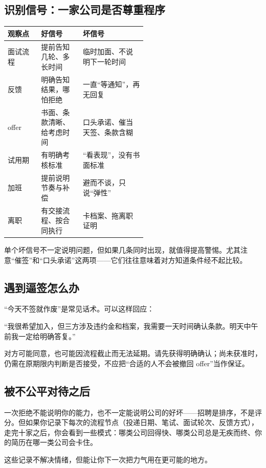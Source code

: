 \documentclass[UTF8,zihao=5,openany]{ctexbook}
\begin{document}
\subsection{识别信号：一家公司是否尊重程序}
\begin{center}\small
\begin{tabularx}{\linewidth}{p{0.24\linewidth}p{0.30\linewidth}Y}
\toprule
观察点 & 好信号 & 坏信号 \\
\midrule
面试流程 & 提前告知几轮、多长时间 & 临时加面、不说明下一轮时间 \\
反馈 & 明确告知结果，哪怕拒绝 & 一直“等通知”，再无回复 \\
offer & 书面、条款清晰、给考虑时间 & 口头承诺、催当天签、条款含糊 \\
试用期 & 有明确考核标准 & “看表现”，没有书面标准 \\
加班 & 提前说明节奏与补偿 & 避而不谈，只说“弹性” \\
离职 & 有交接流程、按合同执行 & 卡档案、拖离职证明 \\
\bottomrule
\end{tabularx}
\end{center}

单个坏信号不一定说明问题，但如果几条同时出现，就值得提高警惕。尤其注意“催签”和“口头承诺”这两项——它们往往意味着对方知道条件经不起比较。

\subsection{遇到逼签怎么办}
“今天不签就作废”是常见话术。可以这样回应：

“我很希望加入，但三方涉及违约金和档案，我需要一天时间确认条款。明天中午前我一定给明确答复。”

对方可能同意，也可能因流程截止而无法延期。请先获得明确确认；尚未获准时，仍需在原期限内判断是否接受，不应把“合适的人不会被撤回 offer”当作保证。

\subsection{被不公平对待之后}
一次拒绝不能说明你的能力，也不一定能说明公司的好坏——招聘是排序，不是评分。但如果你记录下每次的流程节点（投递日期、笔试、面试轮次、反馈方式），走完十家之后，你会看到一些模式：哪类公司回得快、哪类公司总是无疾而终、你的简历在哪一类公司会卡住。

这些记录不解决情绪，但能让你下一次把力气用在更可能的地方。
\end{document}
